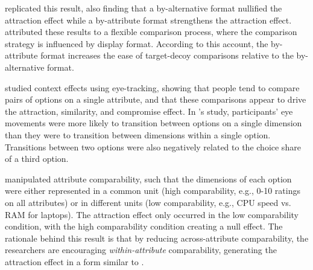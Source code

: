 \textcite{cataldoComparisonProcessAccount2019b} replicated this result, also finding that a by-alternative format nullified the attraction effect while a by-attribute format strengthens the attraction effect. \textcite{cataldoComparisonProcessAccount2019b} attributed these results to a flexible comparison process, where the comparison strategy is influenced by display format. According to this account, the by-attribute format increases the ease of target-decoy comparisons relative to the by-alternative format. 

\textcite{noguchi2014attraction} studied context effects using eye-tracking, showing that people tend to compare pairs of options on a single attribute, and that these comparisons appear to drive the attraction, similarity, and compromise effect. In \textcite{noguchi2014attraction}'s study, participants' eye movements were more likely to transition between options on a single dimension than they were to transition between dimensions within a single option. Transitions between two options were also negatively related to the choice share of a third option.

\textcite{hayes2024attribute} manipulated attribute comparability, such that the dimensions of each option were either represented in a common unit (high comparability, e.g., 0-10 ratings on all attributes) or in different units (low comparability, e.g., CPU speed vs. RAM for laptops). The attraction effect only occurred in the low comparability condition, with the high comparability condition creating a null effect. The rationale behind this result is that by reducing across-attribute comparability, the researchers are encouraging \textit{within-attribute} comparability, generating the attraction effect in a form similar to \textcite{cataldoComparisonProcessAccount2019b}. 


